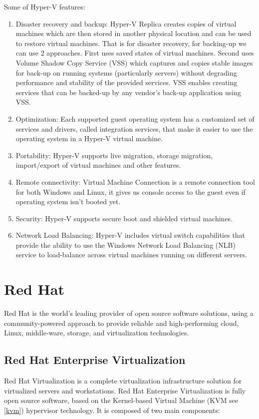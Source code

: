 Some of Hyper-V features:
\begin{enumerate}
\item Disaster recovery and backup: Hyper-V Replica creates copies of virtual machines which are then stored in another physical location and can be used to restore virtual machines. That is for disaster recovery, for backing-up we can use 2 approaches. First uses saved states of virtual machines. Second uses Volume Shadow Copy Service (VSS) which captures and copies stable images for back-up on running systems (particularly servers) without degrading performance and stability of the provided services. VSS enables creating services that can be backed-up by any vendor's back-up application using VSS.
\item Optimization: Each supported guest operating system has a customized set of services and drivers, called integration services, that make it easier to use the operating system in a Hyper-V virtual machine.
\item Portability: Hyper-V supports live migration, storage migration, import/export of virtual machines and other features.
\item Remote connectivity: Virtual Machine Connection is a remote connection tool for both Windows and Linux, it gives us console access to the guest even if operating system isn't booted yet.
\item Security: Hyper-V supports secure boot and shielded virtual machines.
\item Network Load Balancing: Hyper-V includes virtual switch capabilities that provide the ability to use the Windows Network Load Balancing (NLB) service to load-balance across virtual machines running on different servers.
\end{enumerate}

\section{Red Hat}
Red Hat is the world's leading provider of open source software solutions, using a community-powered approach to provide reliable and high-performing cloud, Linux, middle-ware, storage, and virtualization technologies.

\subsection{Red Hat Enterprise Virtualization} \label{rhev}
Red Hat Virtualization is a complete virtualization infrastructure solution for virtualized servers and workstations. Red Hat Enterprise Virtualization is fully open source software, based on the Kernel-based Virtual Machine (KVM see \ref{kvm}) hypervisor technology. It is  composed of two main components:

